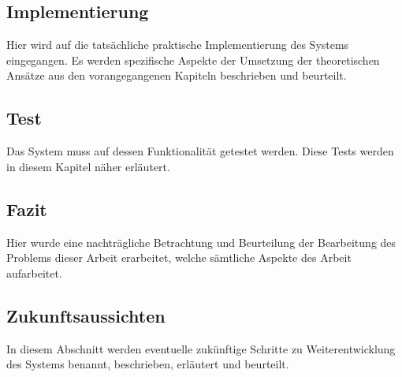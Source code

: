 \subsection{Implementierung}
Hier wird auf die tatsächliche praktische Implementierung des Systems eingegangen. Es werden spezifische Aspekte der Umsetzung der theoretischen Ansätze aus den vorangegangenen Kapiteln beschrieben und beurteilt.
\subsection{Test}
Das System muss auf dessen Funktionalität getestet werden. Diese Tests werden in diesem Kapitel näher erläutert.
\subsection{Fazit}
Hier wurde eine nachträgliche Betrachtung und Beurteilung der Bearbeitung des Problems dieser Arbeit erarbeitet, welche sämtliche Aspekte des Arbeit aufarbeitet.
\subsection{Zukunftsaussichten}
In diesem Abschnitt werden eventuelle zukünftige Schritte zu Weiterentwicklung des Systems benannt, beschrieben, erläutert und beurteilt.